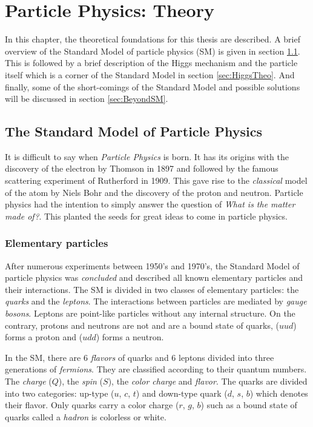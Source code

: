 \chapter{Particle Physics: Theory}

In this chapter, the theoretical foundations for this thesis are described. A brief overview of the Standard Model of particle physics (SM) is given in section \ref{sec:SM}. This is followed by a brief description of the Higgs mechanism and the particle itself which is a corner of the Standard Model in section \ref{sec:HiggsTheo}. And finally, some of the short-comings of the Standard Model and possible solutions will be discussed in section \ref{sec:BeyondSM}.

\section{The Standard Model of Particle Physics}
\label{sec:SM}

It is difficult to say when \textit{Particle Physics} is born. It has its origins with the discovery of the electron by Thomson \cite{JJThomson:1897} in 1897 and followed by the famous scattering experiment of Rutherford \cite{Rutherford:1911} in 1909. This gave rise to the \textit{classical} model of the atom by Niels Bohr and the discovery of the proton and neutron. Particle physics had the intention to simply answer the question of \textit{What is the matter made of?}. This planted the seeds for great ideas to come in particle physics.

\subsection{Elementary particles}

After numerous experiments between 1950's and 1970's, the Standard Model of particle physics was \textit{concluded} and described all known elementary particles and their interactions. The SM is divided in two classes of elementary particles: the \textit{quarks} and the \textit{leptons}. The interactions between particles are mediated by \textit{gauge bosons}. Leptons are point-like particles without any internal structure. On the contrary, protons and neutrons are not and are a bound state of quarks, ($uud$) forms a proton and ($udd$) forms a neutron.

In the SM, there are 6 \textit{flavors} of quarks and 6 leptons divided into three generations of \textit{fermions}. They are classified according to their quantum numbers. The \textit{charge} ($Q$), the \textit{spin} ($S$), the \textit{color charge} and \textit{flavor}. The quarks are divided into two categories: up-type ($u$, $c$, $t$) and down-type quark ($d$, $s$, $b$) which denotes their flavor. Only quarks carry a color charge ($r$, $g$, $b$) such as a bound state of quarks called a \textit{hadron} is colorless or white.

